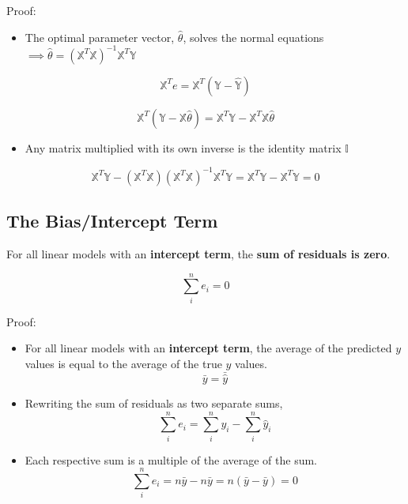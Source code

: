 \documentclass[
  letterpaper,
  DIV=11,
  numbers=noendperiod]{scrreprt}
\providecommand{\tightlist}{%
  \setlength{\itemsep}{0pt}\setlength{\parskip}{0pt}}\usepackage{longtable,booktabs,array}
\begin{document}
\begin{tcolorbox}[enhanced jigsaw, arc=.35mm, colback=white, toprule=.15mm, leftrule=.75mm, bottomrule=.15mm, colframe=quarto-callout-color-frame, rightrule=.15mm, breakable, opacityback=0, left=2mm]

Proof:

\begin{itemize}
\tightlist
\item
  The optimal parameter vector, \(\hat{\theta}\), solves the normal
  equations
  \(\implies \hat{\theta} = (\mathbb{X}^T\mathbb{X})^{-1}\mathbb{X}^T\mathbb{Y}\)
\end{itemize}

\[\mathbb{X}^Te = \mathbb{X}^T (\mathbb{Y} - \mathbb{\hat{Y}}) \]

\[\mathbb{X}^T (\mathbb{Y} - \mathbb{X}\hat{\theta}) = \mathbb{X}^T\mathbb{Y} - \mathbb{X}^T\mathbb{X}\hat{\theta}\]

\begin{itemize}
\tightlist
\item
  Any matrix multiplied with its own inverse is the identity matrix
  \(\mathbb{I}\)
\end{itemize}

\[\mathbb{X}^T\mathbb{Y} - (\mathbb{X}^T\mathbb{X})(\mathbb{X}^T\mathbb{X})^{-1}\mathbb{X}^T\mathbb{Y} = \mathbb{X}^T\mathbb{Y} - \mathbb{X}^T\mathbb{Y} = 0\]

\end{tcolorbox}

\subsection{The Bias/Intercept Term}\label{the-biasintercept-term}

For all linear models with an \textbf{intercept term}, the \textbf{sum
of residuals is zero}.

\[\sum_i^n e_i = 0\]

\begin{tcolorbox}[enhanced jigsaw, arc=.35mm, colback=white, toprule=.15mm, leftrule=.75mm, bottomrule=.15mm, colframe=quarto-callout-color-frame, rightrule=.15mm, breakable, opacityback=0, left=2mm]

Proof:

\begin{itemize}
\tightlist
\item
  For all linear models with an \textbf{intercept term}, the average of
  the predicted \(y\) values is equal to the average of the true \(y\)
  values. \[\bar{y} = \bar{\hat{y}}\]
\item
  Rewriting the sum of residuals as two separate sums,
  \[\sum_i^n e_i = \sum_i^n y_i - \sum_i^n\hat{y}_i\]
\item
  Each respective sum is a multiple of the average of the sum.
  \[\sum_i^n e_i = n\bar{y} - n\bar{y} = n(\bar{y} - \bar{y}) = 0\]
\end{itemize}

\end{tcolorbox}
\end{document}
